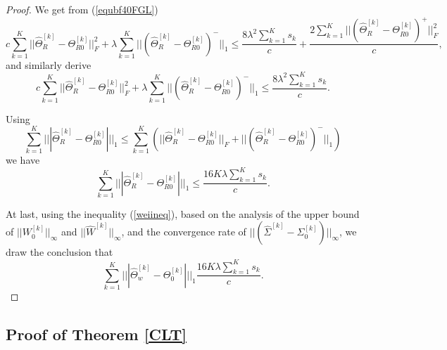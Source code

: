 \documentclass[review]{elsarticle}
\newcommand{\1}{{\bf 1}}
\newcommand{\0}{{\bf 0}}
\newtheorem{proof}{Proof}
\begin{document}
\begin{appendices}
\begin{proof}
 We get from (\ref{equbf40FGL})
\begin{equation}
c\sum_{k=1}^{K}||\widehat{\Theta}_R^{[k]}-\Theta_{R0}^{[k]}||_{F}^{2}
+\lambda\sum_{k=1}^{K}||(\widehat{\Theta}_R^{[k]}-\Theta_{R0}^{[k]})^{-}||_1
\leq
\frac{8\lambda^2\sum_{k=1}^{K}s_k}{c}
+\frac{2\sum_{k=1}^{K}||(\widehat{\Theta}_R^{[k]}-\Theta_{R0}^{[k]})^{+}||_{F}^{2}}{c},
\end{equation}
 and similarly derive
\begin{equation}
c\sum_{k=1}^{K}||\widehat{\Theta}_R^{[k]}-\Theta_{R0}^{[k]}||_{F}^{2}
+\lambda\sum_{k=1}^{K}||(\widehat{\Theta}_R^{[k]}-\Theta_{R0}^{[k]})^{-}||_1
\leq
\frac{8\lambda^2\sum_{k=1}^{K}s_k}{c}.
\end{equation}

 Using
\begin{equation}
\sum_{k=1}^{K}|||\widehat{\Theta}_R^{[k]}-\Theta_{R0}^{[k]}|||_{1}\leq
\sum_{k=1}^{K}\left(||\widehat{\Theta}_R^{[k]}-\Theta_{R0}^{[k]}||_{F}
+||(\widehat{\Theta}_R^{[k]}-\Theta_{R0}^{[k]})^{-}||_1\right)
\end{equation}
 we have
\begin{equation}
\sum_{k=1}^{K}|||\widehat{\Theta}_R^{[k]}-\Theta_{R0}^{[k]}|||_{1}
\leq
\frac{16K\lambda\sum_{k=1}^{K}s_k}{c}.
\end{equation}

 At last, using the inequality (\ref{weiineq}), based on the analysis of the upper bound of $|| W_0^{[k]}  ||_{\infty}$ and $|| \widehat{W}^{[k]} ||_{\infty}$, and the convergence rate of $||  (\widehat{\Sigma}^{[k]}-\Sigma_0^{[k]}) ||_{\infty}$, we draw the conclusion that
\begin{equation}
\sum_{k=1}^{K}|||\widehat{\Theta}_w^{[k]}-\Theta_{0}^{[k]}|||_1
\frac{16K\lambda\sum_{k=1}^{K}s_k}{c}.
\end{equation}


\end{proof}



\subsection{Proof of Theorem \ref{CLT}}


\end{appendices}
\end{document}
